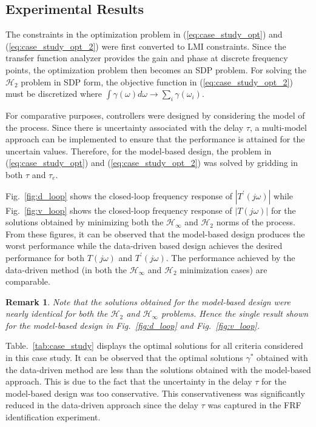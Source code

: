 \documentclass[a4paper, 10pt, conference]{ieeeconf}
\newtheorem*{remark}{Remark}
\begin{document}
\subsection{Experimental Results}
The constraints in the optimization problem in (\ref{eq:case_study_opt}) and (\ref{eq:case_study_opt_2}) were first converted to LMI constraints. Since the transfer function analyzer provides the gain and phase at discrete frequency points, the optimization problem then becomes an SDP problem. For solving the $\mathcal{H}_2$ problem in SDP form, the objective function in (\ref{eq:case_study_opt_2}) must be discretized where $\int \gamma(\omega) d\omega \rightarrow \sum_i \gamma(\omega_i)$.

For comparative purposes, controllers were designed by considering the model of the process.  Since there is uncertainty associated with the delay $\tau$, a multi-model approach can be implemented to ensure that the performance is attained for the uncertain values. Therefore, for the model-based design, the problem in (\ref{eq:case_study_opt}) and (\ref{eq:case_study_opt_2}) was solved by gridding in both $\tau$ and $\tau_e$.

Fig.~\ref{fig:d_loop} shows the closed-loop frequency response of $|T^{\prime}(j\omega)|$ while Fig.~\ref{fig:v_loop} shows the closed-loop frequency response of $|T(j\omega)|$ for the solutions obtained by minimizing both the $\mathcal{H}_{\infty}$ and $\mathcal{H}_2$ norms of the process. From these figures, it can be observed that the model-based design produces the worst performance while the data-driven based design achieves the desired performance for both $T(j\omega)$ and $T^{\prime}(j\omega)$. The performance achieved by the data-driven method (in both the $\mathcal{H}_{\infty}$ and $\mathcal{H}_2$ minimization cases) are comparable. 

\begin{remark}
Note that the solutions obtained for the model-based design were nearly identical for both the $\mathcal{H}_2$ and $\mathcal{H}_\infty$ problems. Hence the single result shown for the model-based design in Fig.~\ref{fig:d_loop} and Fig.~\ref{fig:v_loop}. 
\end{remark}

Table.~\ref{tab:case_study} displays the optimal solutions for all criteria considered in this case study. It can be observed that the optimal solutions $\gamma^*$ obtained with the data-driven method are less than the solutions obtained with the model-based approach. This is due to the fact that the uncertainty in the delay $\tau$ for the model-based design was too conservative. This conservativeness was significantly reduced in the data-driven approach since the delay $\tau$ was captured in the FRF identification experiment. 
\end{document}
